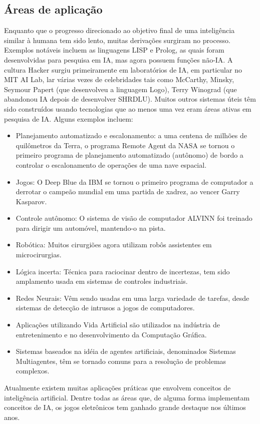\subsection{Áreas de aplicação}
Enquanto que o progresso direcionado ao objetivo final de uma inteligência similar à humana tem sido lento, muitas derivações surgiram no processo. Exemplos notáveis incluem as linguagens LISP e Prolog, as quais foram desenvolvidas para pesquisa em IA, mas agora possuem funções não-IA. A cultura Hacker surgiu primeiramente em laboratórios de IA, em particular no MIT AI Lab, lar várias vezes de celebridades tais como McCarthy, Minsky, Seymour Papert (que desenvolveu a linguagem Logo), Terry Winograd (que abandonou IA depois de desenvolver SHRDLU).
Muitos outros sistemas úteis têm sido construídos usando tecnologias que ao menos uma vez eram áreas ativas em pesquisa de IA. Alguns exemplos incluem:
\begin{itemize}
\item Planejamento automatizado e escalonamento: a uma centena de milhões de quilômetros da Terra, o programa Remote Agent da NASA se tornou o primeiro programa de planejamento automatizado (autônomo) de bordo a controlar o escalonamento de operações de uma nave espacial.
\item Jogos: O Deep Blue da IBM se tornou o primeiro programa de computador a derrotar o campeão mundial em uma partida de xadrez, ao vencer Garry Kasparov.
\item Controle autônomo: O sistema de visão de computador ALVINN foi treinado para dirigir um automóvel, mantendo-o na pista.
\item Robótica: Muitos cirurgiões agora utilizam robôs assistentes em microcirurgias.
\item Lógica incerta: Técnica para raciocinar dentro de incertezas, tem sido amplamento usada em sistemas de controles industriais.
\item Redes Neurais: Vêm sendo usadas em uma larga variedade de tarefas, desde sistemas de detecção de intrusos a jogos de computadores.
\item Aplicações utilizando Vida Artificial são utilizados na indústria de entretenimento e no desenvolvimento da Computação Gráfica.
\item Sistemas baseados na idéia de agentes artificiais, denominados Sistemas Multiagentes, têm se tornado comuns para a resolução de problemas complexos.
\end{itemize}
Atualmente existem muitas aplicações práticas que envolvem conceitos de inteligência artificial. Dentre todas as áreas que, de alguma forma implementam conceitos de IA, os jogos eletrônicos tem ganhado grande destaque nos últimos anos.


